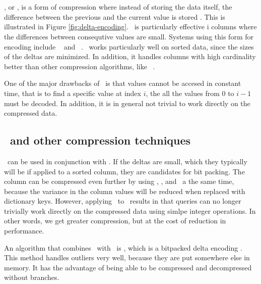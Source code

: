 \section{\dele}
\label{sec:Delta Encoding}
\dele, or , is a form of compression where instead of storing the data itself, the difference between the previous and the current value is stored \cite{Wikipedia_contributors2015-cb}. This is illustrated in Figure \ref{fig:delta-encoding}. \de~is particularly effective i columns where the differences between consequtive values are small. Systems using this form for encoding include \vertica~\cite{Lamb2012-kg} and \blink~\cite{Raman2008-gi}. \dele~works particularly well on sorted data, since the sizes of the deltas are minimized. In addition, it handles columns with high cardinality better than other compression algorithms, like \rle~\cite{Stonebraker2005-qz}.

One of the major drawbacks of \dele~is that values cannot be accesed in constant time, that is to find a specific value at index $i$, the all the values from $0$ to $i - 1$ must be decoded. In addition, it is in general not trivial to work directly on the compressed data.

\subsection{\dele~and other compression techniques}
\label{sub:Delta Encoding and other compression techniques}
\bp~can be used in conjunction with \dele. If the deltas are small, which they typically will be if applied to a sorted column, they are candidates for bit packing. The column can be compressed even further by using \de, \dele, and \bp~a the same time, because the variance in the column values will be reduced when replaced with dictionary keys. However, applying \dele~to \de~results in that queries can no longer trivially work directly on the compressed data using simlpe integer operations. In other words, we get greater compression, but at the cost of reduction in performance.

An algorithm that combines \dele~with \bp~is \pfdelta, which is a bitpacked delta encoding \cite{Bjorklund2011-wh}. This method handles outliers very well, because they are put somewhere else in memory. It has the advantage of being able to be compressed and decompressed without branches. 

